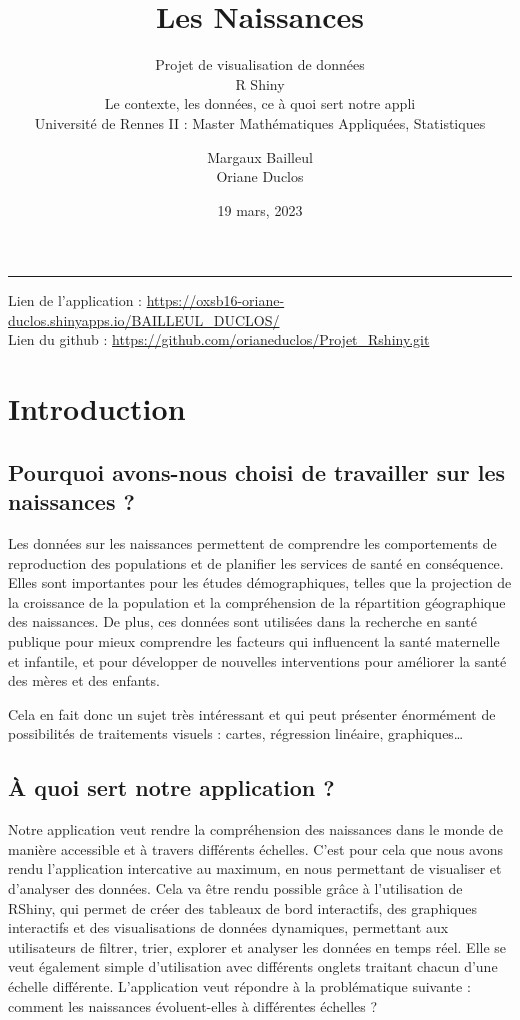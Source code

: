 \documentclass[
]{article}
\title{Les Naissances}
\subtitle{Projet de visualisation de données\\
R Shiny\\
Le contexte, les données, ce à quoi sert notre appli\\
Université de Rennes II : Master Mathématiques Appliquées, Statistiques}
\author{Margaux Bailleul\\
Oriane Duclos}
\date{19 mars, 2023}
\begin{document}
\maketitle

{
\setcounter{tocdepth}{2}
\tableofcontents
}
\begin{center}\rule{0.5\linewidth}{0.5pt}\end{center}

Lien de l'application :
\url{https://oxsb16-oriane-duclos.shinyapps.io/BAILLEUL_DUCLOS/}\\
Lien du github : \url{https://github.com/orianeduclos/Projet_Rshiny.git}

\hypertarget{introduction}{%
\section{Introduction}\label{introduction}}

\hypertarget{pourquoi-avons-nous-choisi-de-travailler-sur-les-naissances}{%
\subsection{Pourquoi avons-nous choisi de travailler sur les naissances
?}\label{pourquoi-avons-nous-choisi-de-travailler-sur-les-naissances}}

Les données sur les naissances permettent de comprendre les
comportements de reproduction des populations et de planifier les
services de santé en conséquence. Elles sont importantes pour les études
démographiques, telles que la projection de la croissance de la
population et la compréhension de la répartition géographique des
naissances. De plus, ces données sont utilisées dans la recherche en
santé publique pour mieux comprendre les facteurs qui influencent la
santé maternelle et infantile, et pour développer de nouvelles
interventions pour améliorer la santé des mères et des enfants.

Cela en fait donc un sujet très intéressant et qui peut présenter
énormément de possibilités de traitements visuels : cartes, régression
linéaire, graphiques\ldots{}

\hypertarget{uxe0-quoi-sert-notre-application}{%
\subsection{À quoi sert notre application
?}\label{uxe0-quoi-sert-notre-application}}

Notre application veut rendre la compréhension des naissances dans le
monde de manière accessible et à travers différents échelles. C'est pour
cela que nous avons rendu l'application intercative au maximum, en nous
permettant de visualiser et d'analyser des données. Cela va être rendu
possible grâce à l'utilisation de RShiny, qui permet de créer des
tableaux de bord interactifs, des graphiques interactifs et des
visualisations de données dynamiques, permettant aux utilisateurs de
filtrer, trier, explorer et analyser les données en temps réel. Elle se
veut également simple d'utilisation avec différents onglets traitant
chacun d'une échelle différente. L'application veut répondre à la
problématique suivante : comment les naissances évoluent-elles à
différentes échelles ?
\end{document}

